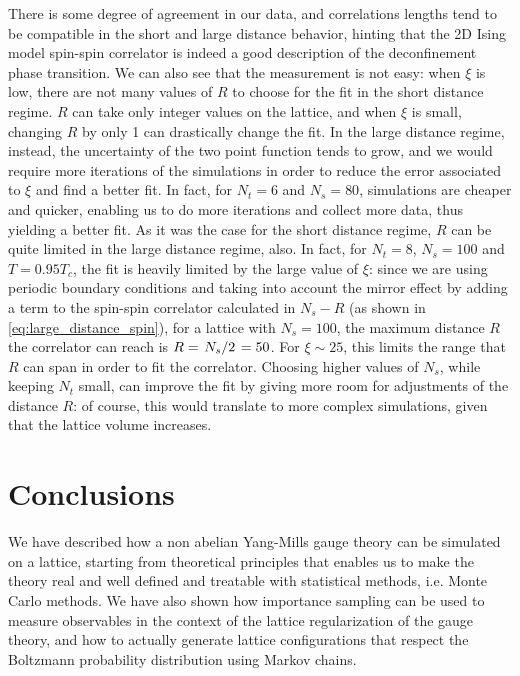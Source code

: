 \documentclass[reqno,12pt]{article}
\numberwithin{equation}{section}
\begin{document}
There is some degree of agreement in our data, and correlations lengths tend to be compatible in the short
and large distance behavior, hinting that the 2D Ising model spin-spin correlator is indeed a good description
of the deconfinement phase transition. We can also see that the measurement is not easy: when $\xi$ is low, there
are not many values of $R$ to choose for the fit in the short distance regime. $R$ can take only integer values on the lattice,
and when $\xi$ is small, changing $R$ by only 1 can drastically change the fit. In the large distance regime, instead, the
uncertainty of the two point function tends to grow, and we would require more iterations of the simulations in order to reduce
the error associated to $\xi$ and find a better fit. In fact, for $N_t = 6$ and $N_s = 80$, simulations are cheaper and quicker,
enabling us to do more iterations and collect more data, thus yielding a better fit. As it was the case for the short distance
regime, $R$ can be quite limited in the large distance regime, also. In fact, for $N_t = 8$, $N_s = 100$ and $T = 0.95T_c$,
the fit is heavily limited by the large value of $\xi$: since we are using periodic boundary conditions and taking into 
account the mirror effect by adding a term to the spin-spin correlator calculated
in $N_s - R$ (as shown in \eqref{eq:large_distance_spin}), for a lattice with $N_s = 100$, the maximum distance $R$ the
correlator can reach is $R = \flatfrac{N_s}{2} = 50$. For $\xi \sim 25$, this limits the range that $R$ can span in order
to fit the correlator. Choosing higher values of $N_s$, while keeping $N_t$ small, can improve the fit by giving more room
for adjustments of the distance $R$: of course, this would translate to more complex simulations, given that the lattice
volume increases. 

\section{Conclusions} \label{conclusions}

We have described how a non abelian Yang-Mills gauge theory can be simulated on a lattice, starting from theoretical principles
that enables us to make the theory real and well defined and treatable with statistical methods, i.e. Monte Carlo methods.
We have also shown how importance sampling can be used to measure observables in the context of the lattice regularization
of the gauge theory, and how to actually generate lattice configurations that respect the Boltzmann probability 
distribution using Markov chains.
\end{document}
